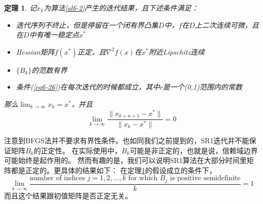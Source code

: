 \documentclass{article}
\newtheorem{thm}{定理}
\begin{document}
\begin{thm}
  \label{thm6-7}
  记$x_k$为算法\ref{al6-2}产生的迭代结果，且下述条件满足：
  \begin{itemize}
    \item [c1] 迭代序列不终止，但是停留在一个闭有界凸集$D$中，$f$在$D$上二次连续可微，且在$D$中有唯一稳定点$x^*$
    \item [c2] Hessian矩阵$f(x^*)$正定，且$\nabla^2f(x)$在$x^*$附近Lipschitz连续
    \item [c3] $\{B_k\}$的范数有界
    \item [c4] 条件(\ref{eq6-26})在每次迭代的时候都成立，其中$r$是一个(0,1)范围内的常数
  \end{itemize}
  那么$\lim_{k\rightarrow\infty}x_k = x^*$，并且
  \[
    \lim_{k\rightarrow\infty}\frac{\|x_{k+n+1}-x^*\|}{\|x_k-x^*\|} = 0
  \]
\end{thm}
注意到BFGS法并不要求有界性条件。也如同我们之前提到的，SR1迭代并不能保证矩阵$B_k$的正定性。
在实际使用中，$B_k$可能是非正定的，也就是说，信赖域边界可能始终是起作用的。
然而有趣的是，我们可以说明SR1算法在大部分时间里矩阵都是正定的。更具体的结果如下：
在定理\ref{thm6-7}的假设成立的条件下，
\[
  \lim_{k\rightarrow \infty}\frac{\text{number of indices }j=1,2,\dots,k\text{ for which }B_j\text{ is positive semidefinite}}k = 1
\]
而且这个结果跟初值矩阵是否正定无关。
\end{document}
